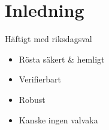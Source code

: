 \section{Inledning}

\frame{\titlepage}

\begin{frame}{Häftigt med riksdagsval}

\begin{itemize}
\item Rösta säkert \& hemligt
\item Verifierbart
\item Robust
\pause
\item Kanske ingen valvaka
\end{itemize}

\end{frame}